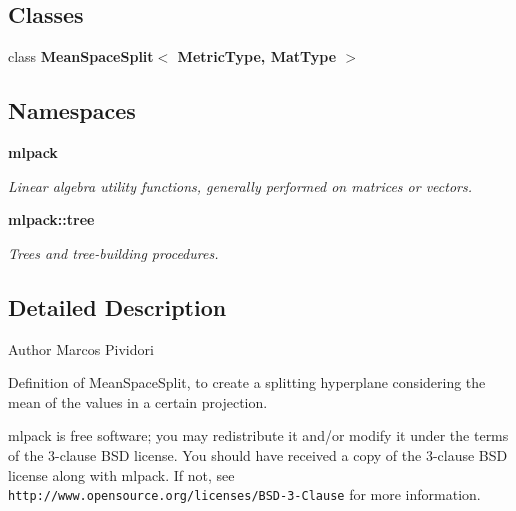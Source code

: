 \subsection*{Classes}
\begin{DoxyCompactItemize}
\item 
class \textbf{ Mean\+Space\+Split$<$ Metric\+Type, Mat\+Type $>$}
\end{DoxyCompactItemize}
\subsection*{Namespaces}
\begin{DoxyCompactItemize}
\item 
 \textbf{ mlpack}
\begin{DoxyCompactList}\small\item\em Linear algebra utility functions, generally performed on matrices or vectors. \end{DoxyCompactList}\item 
 \textbf{ mlpack\+::tree}
\begin{DoxyCompactList}\small\item\em Trees and tree-\/building procedures. \end{DoxyCompactList}\end{DoxyCompactItemize}


\subsection{Detailed Description}
\begin{DoxyAuthor}{Author}
Marcos Pividori
\end{DoxyAuthor}
Definition of Mean\+Space\+Split, to create a splitting hyperplane considering the mean of the values in a certain projection.

mlpack is free software; you may redistribute it and/or modify it under the terms of the 3-\/clause B\+SD license. You should have received a copy of the 3-\/clause B\+SD license along with mlpack. If not, see {\tt http\+://www.\+opensource.\+org/licenses/\+B\+S\+D-\/3-\/\+Clause} for more information. 